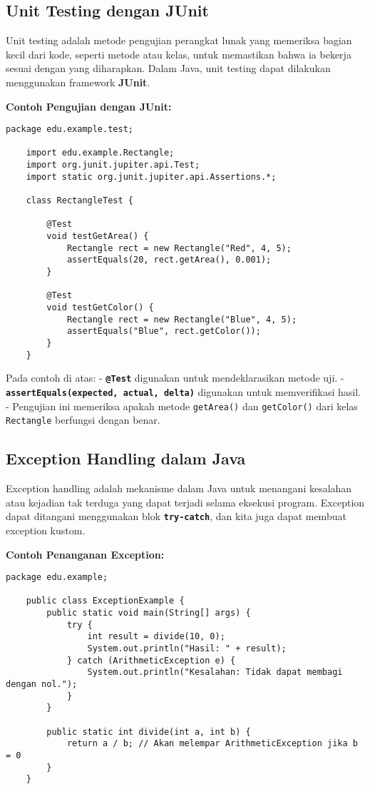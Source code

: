 \subsection{Unit Testing dengan JUnit}

Unit testing adalah metode pengujian perangkat lunak yang memeriksa bagian kecil dari kode, seperti metode atau kelas, untuk memastikan bahwa ia bekerja sesuai dengan yang diharapkan. Dalam Java, unit testing dapat dilakukan menggunakan framework \textbf{JUnit}.

\textbf{Contoh Pengujian dengan JUnit:}

\begin{lstlisting}[style=JavaStyle]
	package edu.example.test;
	
	import edu.example.Rectangle;
	import org.junit.jupiter.api.Test;
	import static org.junit.jupiter.api.Assertions.*;
	
	class RectangleTest {
		
		@Test
		void testGetArea() {
			Rectangle rect = new Rectangle("Red", 4, 5);
			assertEquals(20, rect.getArea(), 0.001);
		}
		
		@Test
		void testGetColor() {
			Rectangle rect = new Rectangle("Blue", 4, 5);
			assertEquals("Blue", rect.getColor());
		}
	}
\end{lstlisting}

Pada contoh di atas:
- \textbf{\texttt{@Test}} digunakan untuk mendeklarasikan metode uji.
- \textbf{\texttt{assertEquals(expected, actual, delta)}} digunakan untuk memverifikasi hasil.
- Pengujian ini memeriksa apakah metode \texttt{getArea()} dan \texttt{getColor()} dari kelas \texttt{Rectangle} berfungsi dengan benar.

\subsection{Exception Handling dalam Java}

Exception handling adalah mekanisme dalam Java untuk menangani kesalahan atau kejadian tak terduga yang dapat terjadi selama eksekusi program. Exception dapat ditangani menggunakan blok \textbf{\texttt{try-catch}}, dan kita juga dapat membuat exception kustom.

\textbf{Contoh Penanganan Exception:}

\begin{lstlisting}[style=JavaStyle]
	package edu.example;
	
	public class ExceptionExample {
		public static void main(String[] args) {
			try {
				int result = divide(10, 0);
				System.out.println("Hasil: " + result);
			} catch (ArithmeticException e) {
				System.out.println("Kesalahan: Tidak dapat membagi dengan nol.");
			}
		}
		
		public static int divide(int a, int b) {
			return a / b; // Akan melempar ArithmeticException jika b = 0
		}
	}
\end{lstlisting}

